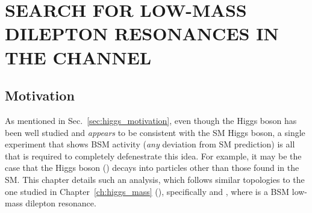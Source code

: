 \chapter{SEARCH FOR LOW-MASS DILEPTON RESONANCES IN THE \texorpdfstring{\htofourl}{H TO 4l} CHANNEL}
\label{ch:dilep_res}

\section{Motivation}
As mentioned in Sec.~\ref{sec:higgs_motivation}, even though the Higgs boson has been well studied and \emph{appears} to be consistent with the SM Higgs boson, a single experiment that shows BSM activity (\ie \emph{any} deviation from SM prediction) is all that is required to completely defenestrate this idea.
For example, it may be the case that the Higgs boson (\PH) decays into particles other than those found in the SM.
This chapter details such an analysis, which follows similar topologies to the one studied in Chapter~\ref{ch:higgs_mass} (\hzzfourl), specifically \hzxfourl and \hxxfourl, where \PX is a BSM low-mass dilepton resonance.